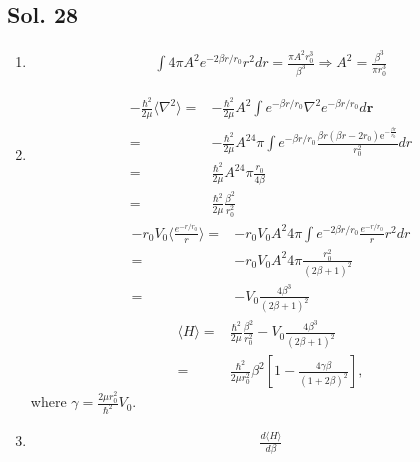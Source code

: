 \subsection*{Sol. 28}
\begin{enumerate}
    \item 
    \begin{align*}
        \int 4\pi A^2e^{-2\beta r/r_0}r^2dr
        =\frac{\pi A^2r_0^3}{\beta^3}\Rightarrow
        A^2 = \frac{\beta^3}{\pi r_0^3}
    \end{align*}
    \item 
    \begin{align*}
        -\frac{\hbar^2}{2\mu}\langle\nabla^2\rangle
        =&
        -\frac{\hbar^2}{2\mu}
        A^2\int 
        e^{-\beta r/r_0}\nabla^2
        e^{-\beta r/r_0} d\bm r\\
        =&
        -\frac{\hbar^2}{2\mu}
        A^24\pi\int 
        e^{-\beta r/r_0}
        \frac{{\beta}r \left({\beta}r - 2r_{0}\right) \mathrm{e}^{-\frac{{\beta}r}{r_{0}}}}{r_{0}^{2}}
        dr\\
        =&
        \frac{\hbar^2}{2\mu}
        A^24\pi
        \frac{r_{0}}{4{\beta}}\\
        =&
        \frac{\hbar^2}{2\mu}
        \frac{\beta^2}{r_0^2}
    \end{align*}
    \begin{align*}
        -r_0V_0
        \langle
        \frac{e^{-r/r_0}}{r}
        \rangle = &
        -r_0V_0 A^2
        4\pi
        \int 
        e^{-2\beta r/r_0}
        \frac{e^{-r/r_0}}{r} r^2 dr\\
        =&
        -r_0V_0 A^2
        4\pi
        \frac{r_{0}^{2}}{\left(2{\beta} + 1\right)^{2}}\\
        =&
        -V_0
        \frac{4\beta^3}{\left(2{\beta} + 1\right)^{2}}
    \end{align*}
    \begin{align*}
        \langle H\rangle
        =&
        \frac{\hbar^2}{2\mu}
        \frac{\beta^2}{r_0^2}
        -V_0
        \frac{4\beta^3}{\left(2{\beta} + 1\right)^{2}}\\
        =&
        \frac{\hbar^2}{2\mu r_0^2}
        \beta^2 
        \left[
        1 - \frac{4\gamma\beta}{(1+2\beta)^2}
        \right],
    \end{align*}
    where $\gamma = \frac{2\mu r_0^2}{\hbar^2}V_0.$
    \item 
    \begin{align*}
        \frac{d\langle H\rangle}{d\beta}

\end{align*}
\end{enumerate}
